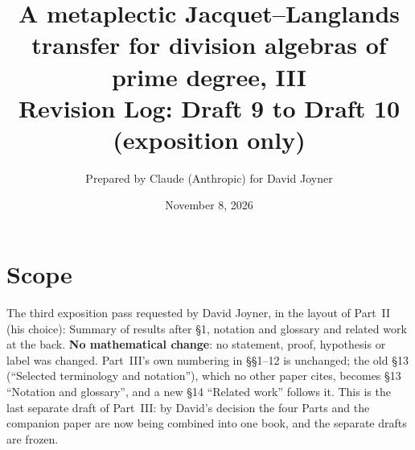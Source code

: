 \documentclass[11pt]{article}
\title{A metaplectic Jacquet--Langlands transfer for division algebras of prime degree, III\\
Revision Log: Draft 9 to Draft 10 (exposition only)}
\author{Prepared by Claude (Anthropic) for David Joyner}
\date{November 8, 2026}
\begin{document}
\maketitle

\section*{Scope}
The third exposition pass requested by David Joyner, in the layout of
Part~II (his choice): Summary of results after \S1, notation and
glossary and related work at the back.  \textbf{No mathematical
change}: no statement, proof, hypothesis or label was changed.
Part~III's own numbering in \S\S1--12 is unchanged; the old \S13
(``Selected terminology and notation''), which no other paper cites,
becomes \S13 ``Notation and glossary'', and a new \S14 ``Related work''
follows it.  This is the last separate draft of Part~III: by David's
decision the four Parts and the companion paper are now being combined
into one book, and the separate drafts are frozen.
\end{document}
